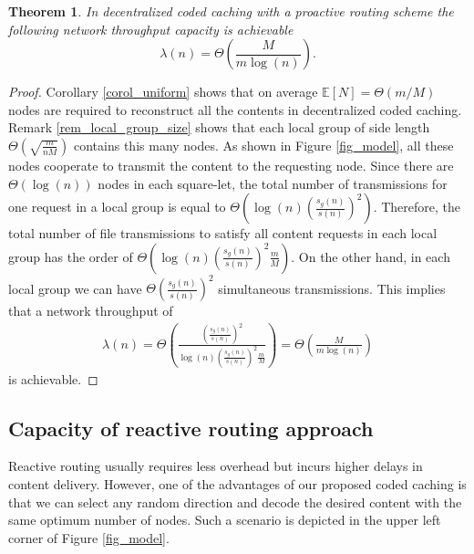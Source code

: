 \documentclass[10pt,journal]{IEEEtran}
\newtheorem{thm}{Theorem}
\begin{document}
\begin{thm}{\em
 In decentralized coded caching with a proactive routing scheme the following network throughput capacity is achievable
 \begin{equation}
  \lambda(n) = \Theta \left( \frac{M}{m\log(n)} \right).
  \label{eq_thm}
 \end{equation}
 \label{thm_capacity}
}\end{thm}
\begin{proof}
Corollary \ref{corol_uniform} shows that on average $\mathbb{E}[N]=\Theta({m}/{M})$ nodes are required to reconstruct all the contents in decentralized coded caching. Remark  \ref{rem_local_group_size} shows that each local group of side length $\Theta \left( \sqrt{\frac{m}{n M}}\right)$ contains this many nodes. As shown in Figure \ref{fig_model}, all these nodes cooperate to transmit the content to the requesting node. Since there are $\Theta(\log(n))$ nodes in each square-let, 
the total number of transmissions for one request in a local group is equal to $\Theta \left(\log(n) \left(\frac{s_g(n)}{s(n)}\right)^2\right)$. Therefore, the total number of file transmissions to satisfy all content requests in each local group has the order of $\Theta \left(\log(n) \left(\frac{s_g(n)}{s(n)}
\right)^2 \frac{m}{M} \right)$. On the other hand, in each local group we can have $\Theta\left(\frac{s_g(n)}{s(n)}\right)^2$ simultaneous transmissions. 
This implies that a network throughput of 
\begin{align}
 \lambda(n) = \Theta \left(\frac{\left(\frac{s_g(n)}{s(n)}\right)^2}{\log(n)
 \left(\frac{s_g(n)}{s(n)}\right)^2 \frac{m}{M}} \right) = 
 \Theta \left( \frac{M}{m\log(n)} \right)
\end{align}
is achievable.
\end{proof}

\subsection{Capacity of reactive routing approach}
Reactive routing usually requires less overhead but incurs higher delays in content delivery. However, one of the advantages of our proposed coded caching is that we can select any random direction and decode the desired content with the same optimum number of nodes. Such a scenario is depicted in the upper left corner of Figure \ref{fig_model}.   
\end{document}

